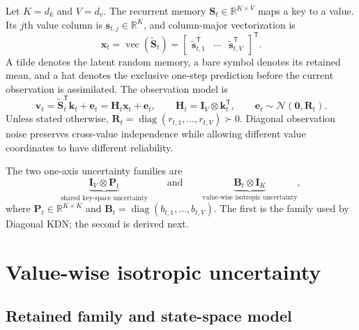 \documentclass[11pt]{article}
\newcommand{\R}{\mathbb{R}}
\newcommand{\ve}[1]{\boldsymbol{#1}}
\newcommand{\tr}{\mathsf{T}}
\newcommand{\diag}{\operatorname{diag}}
\newcommand{\Normal}{\mathcal{N}}
\begin{document}
Let $K=d_k$ and $V=d_v$.  The recurrent memory
$\ve{S}_t\in\R^{K\times V}$ maps a key to a value.  Its $j$th value column is
$\ve{s}_{t,j}\in\R^K$, and column-major vectorization is
\begin{equation}
  \ve{x}_t=\operatorname{vec}(\widetilde{\ve{S}}_t)
  =\begin{bmatrix}
    \widetilde{\ve{s}}_{t,1}^{\tr}&\cdots&
    \widetilde{\ve{s}}_{t,V}^{\tr}
  \end{bmatrix}^{\tr}.
  \label{eq:vec-memory}
\end{equation}
A tilde denotes the latent random memory, a bare symbol denotes its retained mean, and a hat
denotes the exclusive one-step prediction before the current observation is assimilated.  The
observation model is
\begin{equation}
  \ve{v}_t
  =\widetilde{\ve{S}}_t^{\tr}\ve{k}_t+\ve{e}_t
  =\ve{H}_t\ve{x}_t+\ve{e}_t,
  \qquad
  \ve{H}_t=\ve{I}_V\otimes\ve{k}_t^{\tr},
  \qquad
  \ve{e}_t\sim\Normal(\ve{0},\ve{R}_t).
  \label{eq:observation-model}
\end{equation}
Unless stated otherwise,
$\ve{R}_t=\diag(r_{t,1},\ldots,r_{t,V})\succ0$.  Diagonal observation noise preserves
cross-value independence while allowing different value coordinates to have different
reliability.

The two one-axis uncertainty families are
\begin{equation}
  \underbrace{\ve{I}_V\otimes\ve{P}_t}_{\text{shared key-space uncertainty}}
  \qquad\text{and}\qquad
  \underbrace{\ve{B}_t\otimes\ve{I}_K}_{\text{value-wise isotropic uncertainty}},
  \label{eq:one-axis-families}
\end{equation}
where $\ve{P}_t\in\R^{K\times K}$ and
$\ve{B}_t=\diag(b_{t,1},\ldots,b_{t,V})$.  The first is the family used by Diagonal KDN; the
second is derived next.

\section{Value-wise isotropic uncertainty}
\label{sec:value-isotropic}

\subsection{Retained family and state-space model}
\end{document}
